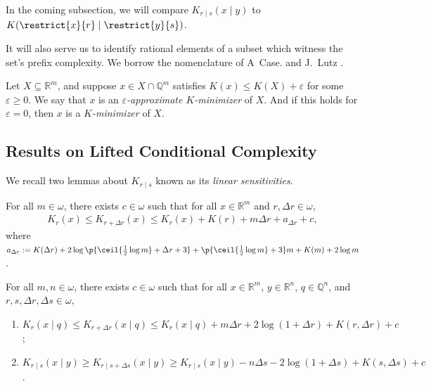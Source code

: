 In the coming subsection, we will compare $K_{r \mid s}(x \mid y)$ to $K(\restrict{x}{r} \mid \restrict{y}{s})$.

It will also serve us to identify rational elements of a subset which witness the set's prefix complexity. We borrow the nomenclature of A~Case. and J.~Lutz \cite{CL14}.
\begin{definition}
    Let $X \subseteq \mathbb{R}^m$, and suppose $x \in X \cap \mathbb{Q}^m$ satisfies $K(x) \leq K(X) + \varepsilon$ for some $\varepsilon \geq 0$. We say that $x$ is an \textit{$\varepsilon$-approximate $K$-minimizer} of $X$. And if this holds for $\varepsilon = 0$, then $x$ is a \textit{$K$-minimizer} of $X$.
\end{definition}

\subsection{Results on Lifted Conditional Complexity}

We recall two lemmas about $K_{r \mid s}$ known as its \textit{linear sensitivities}. 

\begin{lemma}
    For all $m \in \omega$, there exists $c \in \omega$ such that for all $x \in \mathbb{R}^m$ and $r, \Delta r \in \omega$,
    \begin{align*}
        K_r(x) \leq K_{r + \Delta r}(x) \leq K_r(x) + K(r) + m \Delta r + a_{\Delta r} + c,
    \end{align*}
    where $a_{\Delta r} := K(\Delta r) + 2 \log \p{\ceil{\frac{1}{2} \log m} + \Delta r + 3} + \p{\ceil{\frac{1}{2} \log m} + 3} m + K(m) + 2 \log m$.
    \label{lemma:linearity_r_no_condition}
\end{lemma}

\begin{lemma}
    \label{lemma:linearity_with_condition}
    For all $m, n \in \omega$, there exists $c \in \omega$ such that for all $x \in \mathbb{R}^m$, $y \in \mathbb{R}^n$, $q \in \mathbb{Q}^n$, and $r, s, \Delta r, \Delta s \in \omega$,
    \begin{enumerate}[label=(\roman*)]
        \item $K_r(x \mid q) \leq K_{r + \Delta r}(x \mid q) \leq K_{r}(x \mid q) + m \Delta r + 2 \log(1 + \Delta r) + K(r, \Delta r) + c$;
        \item $K_{r \mid s}(x \mid y) \geq K_{r \mid s + \Delta s}(x \mid y) \geq K_{r \mid s}(x \mid y) - n \Delta s - 2 \log(1 + \Delta s) + K(s, \Delta s) + c$.
    \end{enumerate}
\end{lemma}

